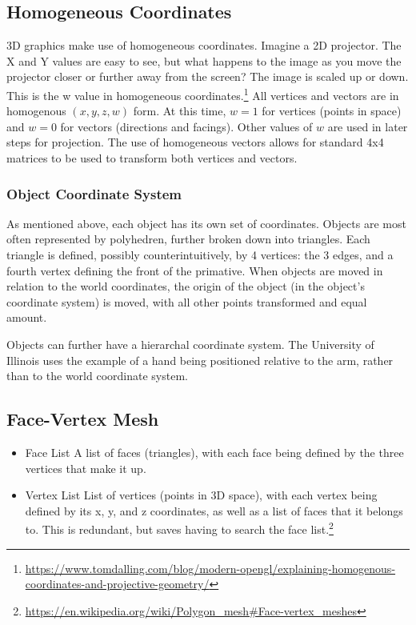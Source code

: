 \documentclass{article}
\begin{document}
\subsection{Homogeneous Coordinates}
3D graphics make use of homogeneous coordinates. Imagine a 2D projector. The X and Y values are easy to see, but what happens to the image as you move the projector closer or further away from the screen? The image is scaled up or down. This is the w value in homogeneous coordinates.\footnote{\url{https://www.tomdalling.com/blog/modern-opengl/explaining-homogenous-coordinates-and-projective-geometry/}} All vertices and vectors are in homogenous $(x, y, z, w)$ form. At this time, $w = 1$ for vertices (points in space) and $w = 0$ for vectors (directions and facings). Other values of $w$ are used in later steps for projection. The use of homogeneous vectors allows for standard 4x4 matrices to be used to transform both vertices and vectors.

\subsubsection{Object Coordinate System}
As mentioned above, each object has its own set of coordinates. Objects are most often represented by polyhedren, further broken down into triangles. Each triangle is defined, possibly counterintuitively, by 4 vertices: the 3 edges, and a fourth vertex defining the front of the primative. When objects are moved in relation to the world coordinates, the origin of the object (in the object's coordinate system) is moved, with all other points transformed and equal amount.

Objects can further have a hierarchal coordinate system. The University of Illinois uses the example of a hand being positioned relative to the arm, rather than to the world coordinate system. 

\subsection{Face-Vertex Mesh}
\begin{itemize}
\item Face List
A list of faces (triangles), with each face being defined by the three vertices that make it up.
\item Vertex List
List of vertices (points in 3D space), with each vertex being defined by its x, y, and z coordinates, as well as a list of faces that it belongs to. This is redundant, but saves having to search the face list.\footnote{\url{https://en.wikipedia.org/wiki/Polygon_mesh\#Face-vertex_meshes}}
\end{itemize}
\end{document}
